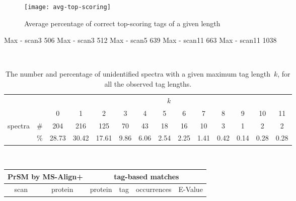 \documentclass{article}[12pt]
\begin{document}
\begin{figure}
  \begin{center}
\texttt{[image: avg-top-scoring]}
\end{center}
\caption{Average percentage of correct top-scoring tags of a given length}
  \label{fig:avg-top-scoring}
\end{figure}





\begin{landscape}

Max - scan3 506
Max - scan3 512
Max - scan5 639
Max - scan11 663
Max - scan11 1038
\begin{table}[h]
\vspace{3mm}\
{\centering
\begin{center}
\begin{tabular}{|c|c|
c|c|c|c|c|c|c|c|c|c|c|c|}
  \hline
  \multicolumn{2}{|c|}{} & \multicolumn{ 12}{|c|}{$k$} \\
  \cline{3-14}
  \multicolumn{2}{|c|}{} 
 & 0 & 1 & 2 & 3 & 4 & 5 & 6 & 7 & 8 & 9 & 10 & 11\\
  \hline
  \multirow{2}{*}{spectra} & \#
 & 204 & 216 & 125 & 70 & 43 & 18 & 16 & 10 & 3 & 1 & 2 & 2\\
   & \%
 & 28.73 & 30.42 & 17.61 & 9.86 & 6.06 & 2.54 & 2.25 & 1.41 & 0.42 & 0.14 & 0.28 & 0.28\\
  \hline
\end{tabular}
\end{center}
\par}
\centering
\caption{The number and percentage of unidentified spectra with a given maximum tag length~$k$, for all the observed tag lengths.}
\vspace{3mm}
\label{table:unident-tags}
\end{table}


\begin{table}[h]\footnotesize
\vspace{3mm}\
{\centering
\begin{center}
\begin{tabular}{|c|c||c|c|c|c|}
  \hline
  \multicolumn{2}{|c||}{PrSM by MS-Align+} & \multicolumn{4}{|c|}{tag-based matches} \\
  \hline
  scan & protein & protein & tag & occurrences & E-Value\\


\end{tabular}
\end{center}}
\end{table}
\end{landscape}
\end{document}
